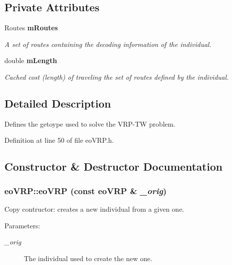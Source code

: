 \subsection*{Private Attributes}
\begin{CompactItemize}
\item 
Routes \bf{m\-Routes}\label{classeo_v_r_p_ecbcda9f187d0d842c043544daa33558}

\begin{CompactList}\small\item\em A set of routes containing the decoding information of the individual. \item\end{CompactList}\item 
double \bf{m\-Length}\label{classeo_v_r_p_0e8c40e00bd835dd380d26d4a3abf544}

\begin{CompactList}\small\item\em Cached cost (length) of traveling the set of routes defined by the individual. \item\end{CompactList}\end{CompactItemize}


\subsection{Detailed Description}
Defines the getoype used to solve the VRP-TW problem. 



Definition at line 50 of file eo\-VRP.h.

\subsection{Constructor \& Destructor Documentation}
\subsubsection{\setlength{\rightskip}{0pt plus 5cm}eo\-VRP::eo\-VRP (const \bf{eo\-VRP} \& {\em \_\-orig})\hspace{0.3cm}{\tt  [inline]}}\label{classeo_v_r_p_1733318610dff5f47ac7d1272a4b4fb1}


Copy contructor: creates a new individual from a given one. 

\begin{Desc}
\item[Parameters:]
\begin{description}
\item[{\em \_\-orig}]The individual used to create the new one. \end{description}
\end{Desc}


